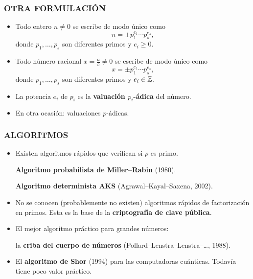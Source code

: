 \begin{frame}
  \frametitle{OTRA FORMULACIÓN}

  \begin{itemize}
  \item<2-> Todo entero $n \ne 0$ se escribe de modo único como
    $$n = \pm p_1^{e_1}\cdots p_s^{e_s},$$
    donde $p_1, \ldots, p_s$ son diferentes primos y $e_i \ge 0$.

  \item<3-> Todo número racional $x = \frac{a}{b} \ne 0$ se escribe de modo
    único como
    $$x = \pm p_1^{e_1}\cdots p_s^{e_s},$$
    donde $p_1, \ldots, p_s$ son diferentes primos y $e_i \in \mathbb{Z}$.

  \item<4-> La potencia $e_i$ de $p_i$ es la \textbf{valuación $p_i$-ádica} del
    número.

  \item<5-> En otra ocasión: valuaciones $p$-ádicas.
    \end{itemize}
\end{frame}

\begin{frame}
  \frametitle{ALGORITMOS}

  \begin{itemize}
  \item<2-> Existen algoritmos rápidos que verifican si $p$ es primo.

    \textbf{Algoritmo probabilista de Miller--Rabin} (1980).

    \textbf{Algoritmo determinista AKS} (Agrawal--Kayal--Saxena, 2002).

  \item<3-> No se conocen (probablemente no existen) algoritmos rápidos de
    factorización en primos. Esta es la base de la
    \textbf{criptografía de clave pública}.

  \item<4-> El mejor algoritmo práctico para grandes números:

    la \textbf{criba del cuerpo de números}
    (Pollard--Lenstra--Lenstra--\dots, 1988).

  \item<5-> El \textbf{algoritmo de Shor} (1994) para las computadoras
    cuánticas. Todavía tiene poco valor práctico.
  \end{itemize}
\end{frame}

